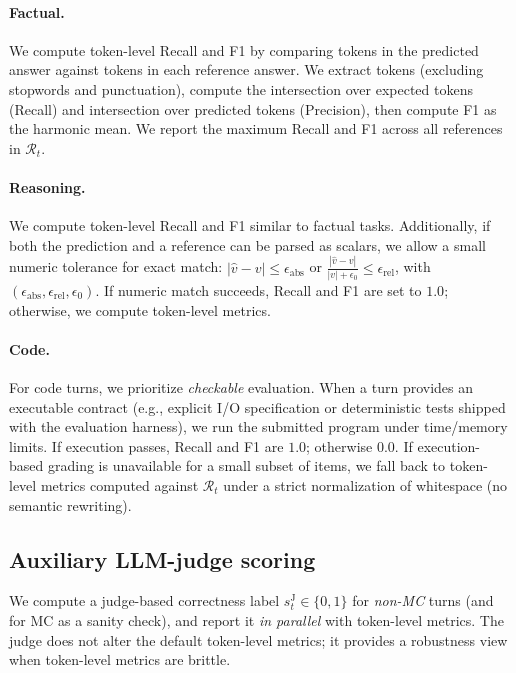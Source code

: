 \paragraph{Factual.}
We compute token-level Recall and F1 by comparing tokens in the predicted answer against tokens in each reference answer.
We extract tokens (excluding stopwords and punctuation), compute the intersection over expected tokens (Recall) and intersection over predicted tokens (Precision), then compute F1 as the harmonic mean.
We report the maximum Recall and F1 across all references in $\mathcal{R}_t$.

\paragraph{Reasoning.}
We compute token-level Recall and F1 similar to factual tasks.
Additionally, if both the prediction and a reference can be parsed as scalars, we allow a small numeric tolerance for exact match:
$|\hat{v}-v| \le \epsilon_{\mathrm{abs}}$ or $\frac{|\hat{v}-v|}{|v|+\epsilon_0} \le \epsilon_{\mathrm{rel}}$, with $\left(\epsilon_{\mathrm{abs}},\epsilon_{\mathrm{rel}},\epsilon_0\right)$.
If numeric match succeeds, Recall and F1 are set to $1.0$; otherwise, we compute token-level metrics.

\paragraph{Code.}
For code turns, we prioritize \emph{checkable} evaluation. When a turn provides an executable contract (e.g., explicit I/O specification or deterministic tests shipped with the evaluation harness), we run the submitted program under time/memory limits.
If execution passes, Recall and F1 are $1.0$; otherwise $0.0$.
If execution-based grading is unavailable for a small subset of items, we fall back to token-level metrics computed against $\mathcal{R}_t$ under a strict normalization of whitespace (no semantic rewriting).

\subsection{Auxiliary LLM-judge scoring}
\label{app:scoring_judge}

We compute a judge-based correctness label $s_t^{\text{J}} \in \{0,1\}$ for \emph{non-MC} turns (and for MC as a sanity check), and report it \emph{in parallel} with token-level metrics.
The judge does not alter the default token-level metrics; it provides a robustness view when token-level metrics are brittle.


